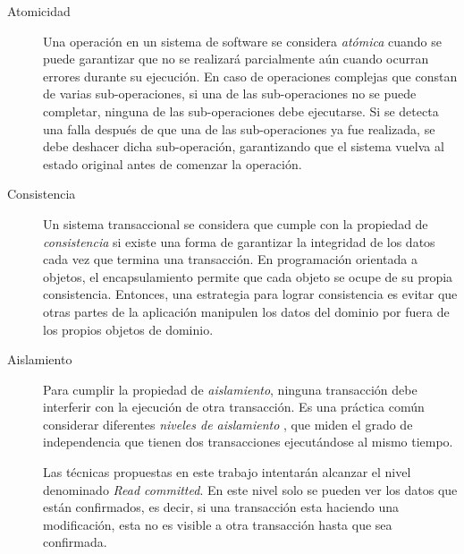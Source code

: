 \begin{description}
	\item[Atomicidad]
		Una operación en un sistema de software se considera \emph{atómica} cuando se
		puede garantizar que no se realizará parcialmente aún cuando ocurran errores
		durante su ejecución. 
		En caso de operaciones complejas que constan de varias sub-operaciones, si una
		de las sub-operaciones no se puede completar, ninguna de las sub-operaciones
		debe ejecutarse. Si se detecta una falla después de que una de las
		sub-operaciones ya fue realizada, se debe deshacer dicha
		sub-operación, garantizando que el sistema vuelva al estado original antes de
		comenzar la operación.
		
	\item[Consistencia]
		Un sistema transaccional se considera que cumple con la propiedad de
		\emph{consistencia} si existe una forma de garantizar la integridad de los
		datos cada vez que termina una transacción.
		En programación orientada a objetos, el encapsulamiento permite que cada
		objeto se ocupe de su propia consistencia. 
		Entonces, una estrategia para lograr consistencia es evitar que otras partes
		de la aplicación manipulen los datos del dominio por fuera de los
		propios objetos de dominio.
	  
	\item[Aislamiento] \label{isolation}
		Para cumplir la propiedad de \emph{aislamiento}, ninguna
		transacción debe interferir con la ejecución de otra transacción.
		Es una práctica común considerar diferentes \emph{niveles de aislamiento}
		\cite{ANSI:1992:ANSd}, que miden el grado de independencia que tienen dos
		transacciones ejecutándose al mismo tiempo.

		Las técnicas propuestas en este trabajo intentarán alcanzar el nivel
		denominado \emph{Read committed}.
		En este nivel solo se pueden ver los datos que están confirmados, es decir, si
		una transacción esta haciendo una modificación, esta no es visible a otra
		transacción hasta que sea confirmada.


% 		
% 				
	
	\end{description}
		
